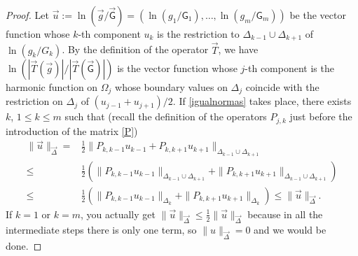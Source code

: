 \documentclass{amsart}
\numberwithin{equation}{section}
\theoremstyle{definition}
\begin{document}
\begin{proof}
 Let $\vec{u} := \ln(\vec{g}/\vec{\mathsf{G}}) = (\ln(g_1/\mathsf{G}_1),\ldots,\ln(g_m/\mathsf{G}_m))$ be the vector function whose $k$-th component  $u_k$ is the restriction to $\Delta_{k-1} \cup \Delta_{k+1}$ of $\ln(g_k/G_k)$.  By the definition of the operator $\vec{T}$, we have  $\ln(|\vec{T}(\vec{g})|/|\vec{T}(\vec{\mathsf{G}})|)$ is the vector function whose $j$-th component is the harmonic function on $\Omega_j$ whose  boundary values on $\Delta_j$ coincide with the restriction on $\Delta_j$ of $(u_{j-1} + u_{j+1})/2$. If \eqref{igualnormas} takes place, there exists $k$, $1\leq k\leq m$ such that (recall the definition of the operators $P_{j,k}$ just before the  introduction of the matrix \eqref{P})
 \begin{align*}
 	\|\vec{u}\|_{\vec{\Delta}} =& \frac{1}{2}\|P_{k,k-1}u_{k-1} + P_{k,k+1}u_{k+1}\|_{\Delta_{k-1}\cup\Delta_{k+1}}\\
 	\leq& \frac{1}{2}\left(\|P_{k,k-1}u_{k-1}\|_{\Delta_{k-1}\cup\Delta_{k+1}} + \|P_{k,k+1}u_{k+1}\|_{\Delta_{k-1}\cup\Delta_{k+1}} \right)\\
 	\leq& \frac{1}{2}\left(\|P_{k,k-1}u_{k-1}\|_{\Delta_k} + \|P_{k,k+1}u_{k+1}\|_{\Delta_{k}}\right) \leq \|\vec{u}\|_{\vec{\Delta}}.
 \end{align*}
If $k=1$ or $k=m$,   you actually get $\|\vec{u}\|_{\vec{\Delta}} \leq \frac{1}{2} \|\vec{u}\|_{\vec{\Delta}}$ because in all the intermediate steps there is only one term, so $\|u\|_{\vec{\Delta}} = 0$ and we would be done.


\end{proof}
\end{document}
